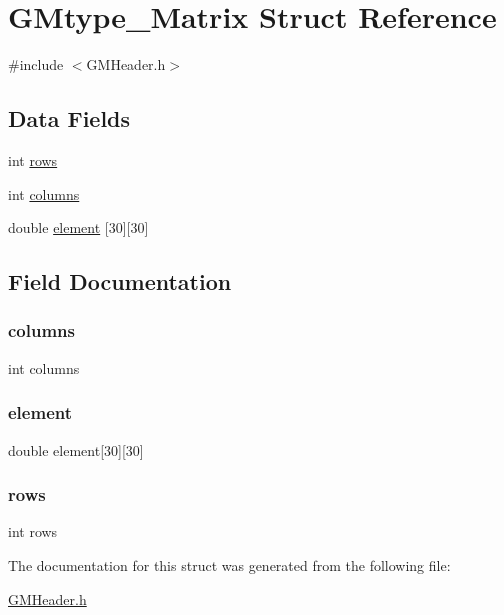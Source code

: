 \hypertarget{struct_g_mtype___matrix}{}\section{G\+Mtype\+\_\+\+Matrix Struct Reference}
\label{struct_g_mtype___matrix}


{\ttfamily \#include $<$G\+M\+Header.\+h$>$}

\subsection*{Data Fields}
\begin{DoxyCompactItemize}
\item 
int \mbox{\hyperlink{struct_g_mtype___matrix_a061459acc9e078fa4699e0e349887215}{rows}}
\item 
int \mbox{\hyperlink{struct_g_mtype___matrix_a341d2f00089fffc71eb6dbfd29f56c89}{columns}}
\item 
double \mbox{\hyperlink{struct_g_mtype___matrix_a65ff66015a15486bd6756f66941e2a70}{element}} \mbox{[}30\mbox{]}\mbox{[}30\mbox{]}
\end{DoxyCompactItemize}


\subsection{Field Documentation}
\mbox{\label{struct_g_mtype___matrix_a341d2f00089fffc71eb6dbfd29f56c89}} 
\subsubsection{\texorpdfstring{columns}{columns}}
{\footnotesize\ttfamily int columns}

\mbox{\label{struct_g_mtype___matrix_a65ff66015a15486bd6756f66941e2a70}} 
\subsubsection{\texorpdfstring{element}{element}}
{\footnotesize\ttfamily double element\mbox{[}30\mbox{]}\mbox{[}30\mbox{]}}

\mbox{\label{struct_g_mtype___matrix_a061459acc9e078fa4699e0e349887215}} 
\subsubsection{\texorpdfstring{rows}{rows}}
{\footnotesize\ttfamily int rows}



The documentation for this struct was generated from the following file\+:\begin{DoxyCompactItemize}
\item 
\mbox{\hyperlink{_g_m_header_8h}{G\+M\+Header.\+h}}\end{DoxyCompactItemize}
